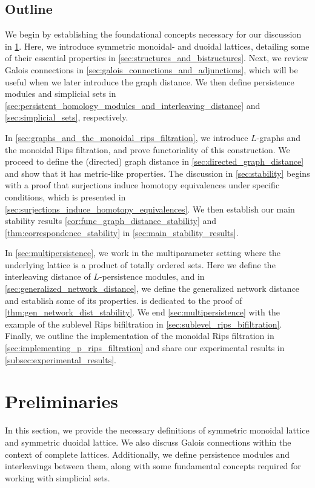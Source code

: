 \documentclass[a4paper,11pt]{article}
\theoremstyle{remark}
\begin{document}
\subsection*{Outline}
We begin by establishing the foundational concepts necessary for our discussion in \cref{sec:preliminaries}. Here, we introduce symmetric monoidal- and duoidal lattices, detailing some of their essential properties in \cref{sec:structures_and_bistructures}. Next, we review Galois connections in \cref{sec:galois_connections_and_adjunctions}, which will be useful when we later introduce the graph distance. We then define persistence modules and simplicial sets in \cref{sec:persistent_homology_modules_and_interleaving_distance} and \cref{sec:simplicial_sets}, respectively.

In \cref{sec:graphs_and_the_monoidal_rips_filtration}, we introduce $L$-graphs and the monoidal Rips filtration, and prove functoriality of this construction. We proceed to define the (directed) graph distance in \cref{sec:directed_graph_distance} and show that it has metric-like properties. The discussion in \cref{sec:stability} begins with a proof that surjections induce homotopy equivalences under specific conditions, which is presented in \cref{sec:surjections_induce_homotopy_equivalences}. We then establish our main stability results \cref{cor:func_graph_distance_stability} and \cref{thm:correspondence_stability} in \cref{sec:main_stability_results}.

In \cref{sec:multipersistence}, we work in the multiparameter setting where the underlying lattice is a product of totally ordered sets. Here we define the interleaving distance of $L$-persistence modules, and in \cref{sec:generalized_network_distance}, we define the generalized network distance and establish some of its properties.  is dedicated to the proof of \cref{thm:gen_network_dist_stability}. We end \cref{sec:multipersistence} with the example of the sublevel Rips bifiltration in \cref{sec:sublevel_rips_bifiltration}. Finally, we outline the implementation of the monoidal Rips filtration in \cref{sec:implementing_p_rips_filtration} and share our experimental results in \cref{subsec:experimental_results}.

\section{Preliminaries}\label{sec:preliminaries}

In this section, we provide the necessary definitions of symmetric monoidal lattice and symmetric duoidal lattice. We also discuss Galois connections within the context of complete lattices. Additionally, we define persistence modules and interleavings between them, along with some fundamental concepts required for working with simplicial sets.
\end{document}
